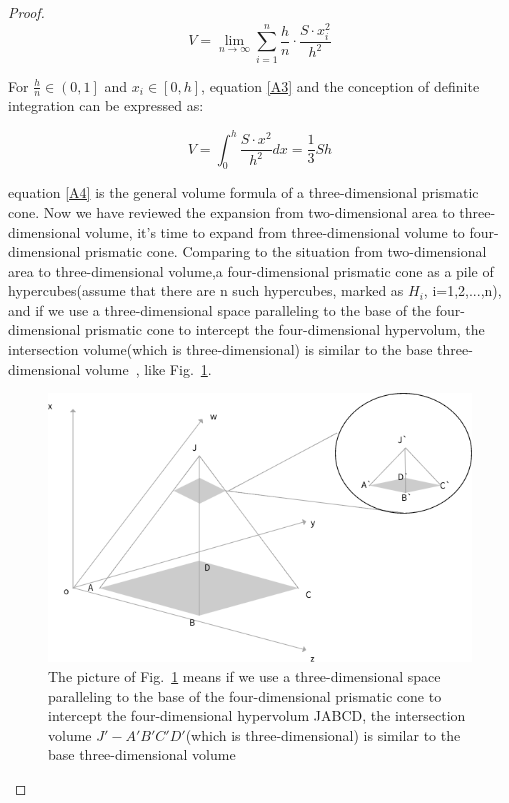 \documentclass[runningheads]{llncs}
\begin{document}
\begin{proof}
\begin{equation}\label{A3}
V=\lim \limits_{n \to \infty}\sum_{i=1}^{n}\frac{h}{n}\cdot \frac{S\cdot x_{i}^{2}}{h^{2}}
\end{equation}

For $\frac{h}{n}\in \left ( 0,1\right ]$ and $x_{i}\in \left [ 0,h\right ]$, equation \ref{A3} and the conception of definite integration can be expressed as:

\begin{equation}\label{A4}
V=\int_{0}^{h}\frac{S\cdot x^{2}}{h^{2}}dx = \frac{1}{3}Sh
\end{equation}

equation \ref{A4} is the general volume formula of a three-dimensional prismatic cone.
Now we have reviewed the expansion from two-dimensional area to three-dimensional volume, it's time to expand from three-dimensional volume to four-dimensional prismatic cone.
Comparing to the situation from two-dimensional area to three-dimensional volume,a four-dimensional prismatic cone as a pile of hypercubes(assume that there are n such hypercubes, marked as $H_{i}$, i=1,2,...,n), and if we use a three-dimensional space paralleling to the base of the four-dimensional prismatic cone to intercept the four-dimensional hypervolum, the intersection volume(which is three-dimensional) is similar to the base three-dimensional volume~\cite{ref_url1}, like Fig.~\ref{FigR1_2}.

\begin{figure}
\includegraphics[width=\textwidth]{Fig/FigR1_2.png}
\caption{The picture of Fig.~\ref{FigR1_2} means if we use a three-dimensional space paralleling to the base of the four-dimensional prismatic cone to intercept the four-dimensional hypervolum JABCD, the intersection volume ${J}'-{A}'{B}'{C}'{D}'$(which is three-dimensional) is similar to the base three-dimensional volume} \label{FigR1_2}
\end{figure}


\end{proof}
\end{document}
